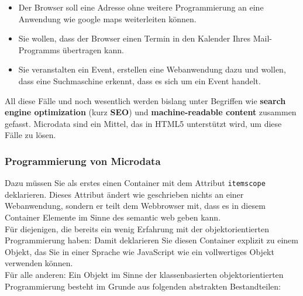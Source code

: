 \begin{itemize}
	\item Der Browser soll eine Adresse ohne weitere Programmierung an eine Anwendung wie google maps weiterleiten können.
	\item Sie wollen, dass der Browser einen Termin in den Kalender Ihres Mail-Programms übertragen kann.
	\item Sie veranstalten ein Event, erstellen eine Webanwendung dazu und wollen, dass eine Suchmaschine erkennt, dass es sich um ein Event handelt.
\end{itemize}

All diese Fälle und noch wesentlich werden bislang unter Begriffen wie \textbf{search engine optimization} (kurz \textbf{SEO}) und \textbf{machine-readable content} zusammen gefasst. Microdata sind ein Mittel, das in HTML5 unterstützt wird, um diese Fälle zu lösen.

\subsubsection{Programmierung von Microdata}

Dazu müssen Sie als erstes einen Container mit dem Attribut \verb|itemscope| deklarieren. Dieses Attribut ändert wie geschrieben nichts an einer Webanwendung, sondern er teilt dem Webbrowser mit, dass es in diesem Container Elemente im Sinne des semantic web geben kann.\\

Für diejenigen, die bereits ein wenig Erfahrung mit der objektorientierten Programmierung haben: Damit deklarieren Sie diesen Container explizit zu einem Objekt, das Sie in einer Sprache wie JavaScript wie ein vollwertiges Objekt verwenden können.\\

Für alle anderen: Ein Objekt im Sinne der klassenbasierten objektorientierten Programmierung besteht im Grunde aus folgenden abstrakten Bestandteilen:

